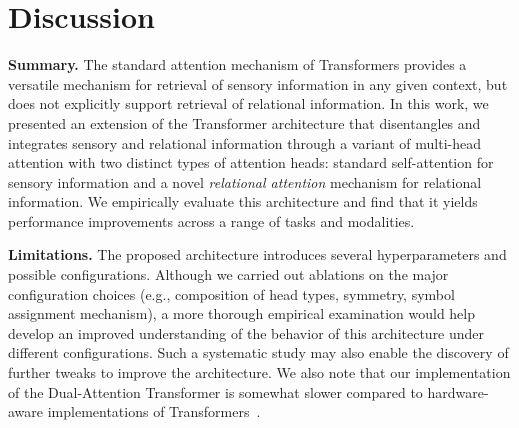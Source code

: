 \section{Discussion}\label{sec:discussion}

\textbf{Summary.} The standard attention mechanism of Transformers provides a versatile mechanism for retrieval of sensory information in any given context, but does not explicitly support retrieval of relational information. In this work, we presented an extension of the Transformer architecture that disentangles and integrates sensory and relational information through a variant of multi-head attention with two distinct types of attention heads: standard self-attention for sensory information and a novel \textit{relational attention} mechanism for relational information. We empirically evaluate this architecture and find that it yields performance improvements across a range of tasks and modalities.

\textbf{Limitations.} The proposed architecture introduces several hyperparameters and possible configurations. Although we carried out ablations on the major configuration choices (e.g., composition of head types, symmetry, symbol assignment mechanism), a more thorough empirical examination would help develop an improved understanding of the behavior of this architecture under different configurations. Such a systematic study may also enable the discovery of further tweaks to improve the architecture. We also note that our implementation of the Dual-Attention Transformer is somewhat slower compared to hardware-aware implementations of Transformers~\citep{dao2022flashattention}.